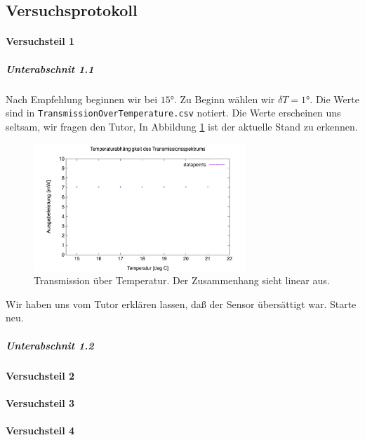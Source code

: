 \documentclass{subfiles}
\begin{document}
    \subsection*{Versuchsprotokoll} 
        

        \paragraph*{Versuchsteil 1}

            \subparagraph*{Unterabschnit 1.1}
                Nach Empfehlung beginnen wir bei $15\si{\degree}$. Zu Beginn wählen wir $\delta T = 1\si{\degree}$. Die Werte sind in \texttt{TransmissionOverTemperature.csv} notiert. Die Werte erscheinen uns seltsam, wir fragen den Tutor, In Abbildung \ref{fig:TransmissionOverTemperatureSuS} ist der aktuelle Stand zu erkennen.
                \begin{figure}[H]
                    \centering
                    \includegraphics[width=8cm]{Bilddateien/TransmissionOverTemperatureSuS.png}
                    \caption{Transmission über Temperatur. Der Zusammenhang sieht linear aus.}
                    \label{fig:TransmissionOverTemperatureSuS}
                \end{figure}
                Wir haben uns vom Tutor erklären lassen, daß der Sensor übersättigt war. 
                Starte neu.
            \subparagraph*{Unterabschnit 1.2}
            

        \paragraph*{Versuchsteil 2}

            
        \paragraph*{Versuchsteil 3}


        \paragraph*{Versuchsteil 4}
\end{document}
